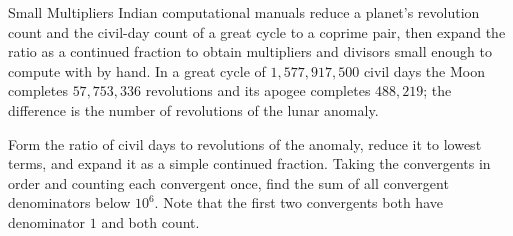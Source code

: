 \begin{problem}{Small Multipliers}
Indian computational manuals reduce a planet's revolution count and the civil-day count of a great cycle to a coprime pair, then expand the ratio as a continued fraction to obtain multipliers and divisors small enough to compute with by hand. In a great cycle of \(1{,}577{,}917{,}500\) civil days the Moon completes \(57{,}753{,}336\) revolutions and its apogee completes \(488{,}219\); the difference is the number of revolutions of the lunar anomaly.

Form the ratio of civil days to revolutions of the anomaly, reduce it to lowest terms, and expand it as a simple continued fraction. Taking the convergents in order and counting each convergent once, find the sum of all convergent denominators below \(10^6\). Note that the first two convergents both have denominator \(1\) and both count.
\end{problem}